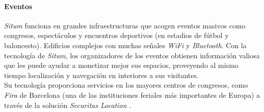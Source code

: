 \paragraph{Eventos}
\textit{Situm} funciona en grandes infraestructuras que acogen eventos masivos como congresos, espectáculos y encuentros deportivos (en estadios de fútbol y baloncesto). Edificios complejos con muchas señales \textit{WiFi} y \textit{Bluetooth}. Con la tecnología de \textit{Situm}, los organizadores de los eventos obtienen información valiosa que les puede ayudar a monetizar mejor sus espacios, proveyendo al mismo tiempo localización y navegación en interiores a sus visitantes.\\
Su tecnología proporciona servicios en los mayores centros de congresos, como \textit{Fira} de Barcelona (una de las instituciones feriales más importantes de Europa) a través de la solución \textit{Securitas Location} \cite{situm_indoor_2018-1}.